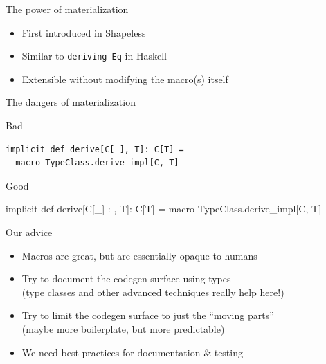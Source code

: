 \documentclass{beamer}
\begin{document}
\begin{frame}{The power of materialization}
  \begin{itemize}
    \item First introduced in Shapeless
    \item Similar to \texttt{deriving Eq} in Haskell
    \item Extensible without modifying the macro(s) itself
  \end{itemize}
\end{frame}

\begin{frame}[fragile]{The dangers of materialization}
  \vspace{1em}
  \begin{alertblock}{Bad}
    \begin{verbatim}
implicit def derive[C[_], T]: C[T] =
  macro TypeClass.derive_impl[C, T]
    \end{verbatim}
  \end{alertblock}

  \vspace{1em}
  \begin{exampleblock}{Good}
    \begin{semiverbatim}
implicit def derive[C[_] : \text{\color{blue}{TypeClass}}, T]: C[T] =
  macro TypeClass.derive_impl[C, T]
    \end{semiverbatim}
  \end{exampleblock}
\end{frame}

\begin{frame}[fragile]{Our advice}
  \begin{itemize}
    \item Macros are great, but are essentially opaque to humans
    \item Try to document the codegen surface using types\\
      (type classes and other advanced techniques really help here!)
    \item Try to limit the codegen surface to just the ``moving parts''\\
      (maybe more boilerplate, but more predictable)
    \item We need best practices for documentation \& testing
  \end{itemize}
\end{frame}

\end{document}
